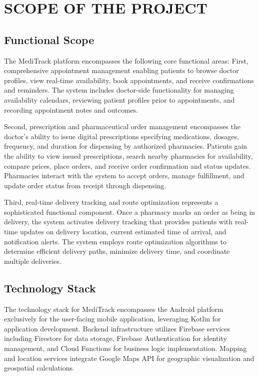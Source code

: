 \documentclass[12pt,a4paper]{report}
\begin{document}
\section{SCOPE OF THE PROJECT}

\subsection{Functional Scope}

The MediTrack platform encompasses the following core functional areas: First, comprehensive appointment management enabling patients to browse doctor profiles, view real-time availability, book appointments, and receive confirmations and reminders. The system includes doctor-side functionality for managing availability calendars, reviewing patient profiles prior to appointments, and recording appointment notes and outcomes.

Second, prescription and pharmaceutical order management encompasses the doctor's ability to issue digital prescriptions specifying medications, dosages, frequency, and duration for dispensing by authorized pharmacies. Patients gain the ability to view issued prescriptions, search nearby pharmacies for availability, compare prices, place orders, and receive order confirmation and status updates. Pharmacies interact with the system to accept orders, manage fulfillment, and update order status from receipt through dispensing.

Third, real-time delivery tracking and route optimization represents a sophisticated functional component. Once a pharmacy marks an order as being in delivery, the system activates delivery tracking that provides patients with real-time updates on delivery location, current estimated time of arrival, and notification alerts. The system employs route optimization algorithms to determine efficient delivery paths, minimize delivery time, and coordinate multiple deliveries.

\subsection{Technology Stack}

The technology stack for MediTrack encompasses the Android platform exclusively for the user-facing mobile application, leveraging Kotlin for application development. Backend infrastructure utilizes Firebase services including Firestore for data storage, Firebase Authentication for identity management, and Cloud Functions for business logic implementation. Mapping and location services integrate Google Maps API for geographic visualization and geospatial calculations.
\end{document}
